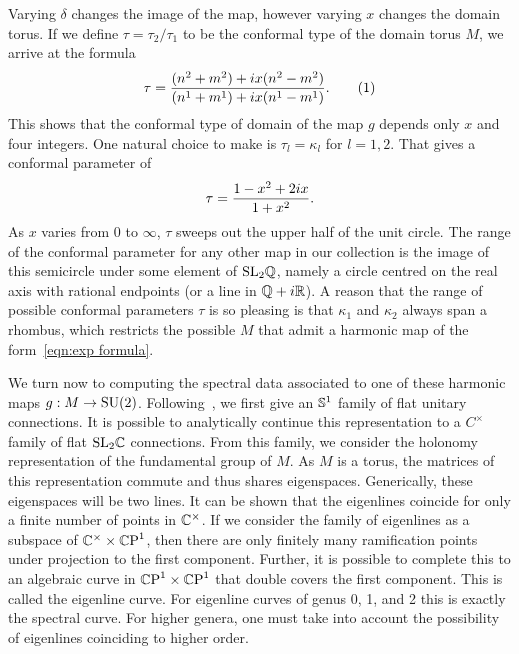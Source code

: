 \documentclass{article}
\begin{document}
Varying $\delta$ changes the image of the map, however varying $x$ changes the domain torus. If we define $\tau = \tau_2/\tau_1$ to be the conformal type of the domain torus $M$, we arrive at the formula
\[
\tau
= \frac{(n^2 + m^2) + \iu x(n^2 - m^2)}
{(n^1+m^1) +\iu x(n^1-m^1)}.
\labelthis{eqn:conformal type}
\]
This shows that the conformal type of domain of the map $g$ depends only $x$ and four integers. One natural choice to make is $\tau_l=\kappa_l$ for $l=1,2$. That gives a conformal parameter of 
\[
\tau = \frac{1-x^2 + 2\iu x}{1+x^2}.
\]
As $x$ varies from $0$ to $\infty$, $\tau$ sweeps out the upper half of the unit circle. The range of the conformal parameter for any other map in our collection is the image of this semicircle under some element of $\SL_2\Q$, namely a circle centred on the real axis with rational endpoints (or a line in $\Q+\iu\R$).
A reason that the range of possible conformal parameters $\tau$ is so pleasing is that $\kappa_1$ and $\kappa_2$ always span a rhombus, which restricts the possible $M$ that admit a harmonic map of the form~\eqref{eqn:exp formula}.





We turn now to computing the spectral data associated to one of these harmonic maps $g: M \to \SU(2)$. Following~\cite{Hitchin1990}, we first give an $\S^1$ family of flat unitary connections. It is possible to analytically continue this representation to a $C^\times$ family of flat $\SL_2\C$ connections. From this family, we consider the holonomy representation of the fundamental group of $M$. As $M$ is a torus, the matrices of this representation commute and thus shares eigenspaces. Generically, these eigenspaces will be two lines. It can be shown that the eigenlines coincide for only a finite number of points in $\C^\times$. If we consider the family of eigenlines as a subspace of $\C^\times \times \CP^1$, then there are only finitely many ramification points under projection to the first component. Further, it is possible to complete this to an algebraic curve in $\CP^1 \times \CP^1$ that double covers the first component. This is called the eigenline curve. For eigenline curves of genus 0, 1, and 2 this is exactly the spectral curve. For higher genera, one must take into account the possibility of eigenlines coinciding to higher order.
\end{document}
